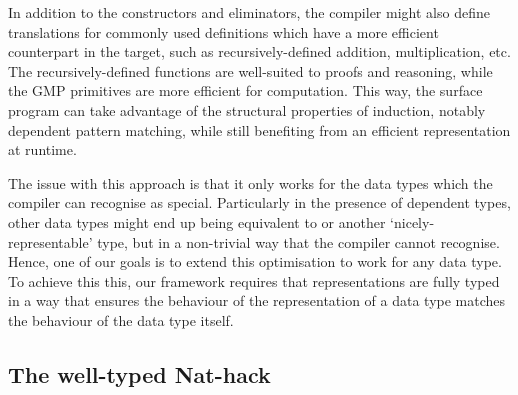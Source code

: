 In addition to the constructors and eliminators, the compiler might also define
translations for commonly used definitions which have a more efficient
counterpart in the target, such as recursively-defined addition, multiplication,
etc. The recursively-defined functions are well-suited to proofs and reasoning,
while the GMP primitives are more efficient for computation. This way, the surface
program can take advantage of the structural properties of induction, notably dependent
pattern matching, while still benefiting from an efficient representation at runtime.

The issue with this approach is that it only works for the data types which the
compiler can recognise as special. Particularly in the presence of dependent
types, other data types might end up being equivalent to  or
another `nicely-representable' type, but in a non-trivial way that the compiler
cannot recognise. Hence, one of our goals is to extend this optimisation to work
for any data type. To achieve this this, our framework requires that
representations are fully typed in a way that ensures the behaviour of the
representation of a data type matches the behaviour of the data type itself.

\subsection{The well-typed Nat-hack}

